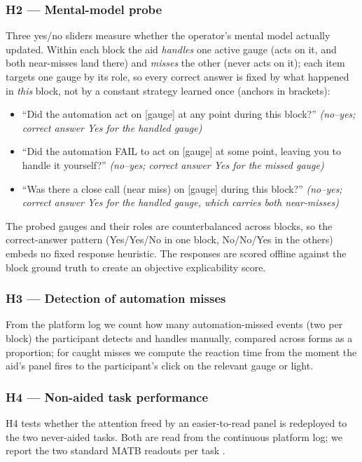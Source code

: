 \documentclass[10pt,twocolumn]{article}
\begin{document}
\subsubsection{H2 --- Mental-model probe}
Three yes/no sliders measure whether the operator's mental model actually updated. Within each block the aid \textit{handles} one active gauge (acts on it, and both near-misses land there) and \textit{misses} the other (never acts on it); each item targets one gauge by its role, so every correct answer is fixed by what happened in \textit{this} block, not by a constant strategy learned once (anchors in brackets):
\begin{itemize}
  \item ``Did the automation act on [gauge] at any point during this block?'' \textit{(no--yes; correct answer Yes for the handled gauge)}
  \item ``Did the automation FAIL to act on [gauge] at some point, leaving you to handle it yourself?'' \textit{(no--yes; correct answer Yes for the missed gauge)}
  \item ``Was there a close call (near miss) on [gauge] during this block?'' \textit{(no--yes; correct answer Yes for the handled gauge, which carries both near-misses)}
\end{itemize}
The probed gauges and their roles are counterbalanced across blocks, so the correct-answer pattern (Yes/Yes/No in one block, No/No/Yes in the others) embeds no fixed response heuristic. The responses are scored offline against the block ground truth to create an objective explicability score.

\subsubsection{H3 --- Detection of automation misses}
From the platform log we count how many automation-missed events (two per block) the participant detects and handles manually, compared across forms as a proportion; for caught misses we compute the reaction time from the moment the aid's panel fires to the participant's click on the relevant gauge or light.

\subsubsection{H4 --- Non-aided task performance}
\label{sec:h4-measures}
H4 tests whether the attention freed by an easier-to-read panel is redeployed to the two never-aided tasks. Both are read from the continuous platform log; we report the two standard MATB readouts per task \parencite{Comstock1992,SantiagoEspada2011,Cegarra2020}.
\end{document}
